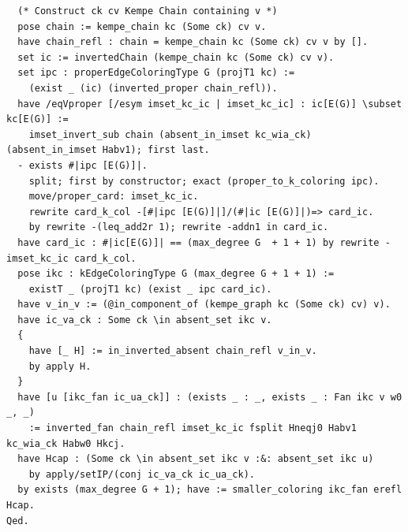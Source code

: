 \begin{verbatim}
  (* Construct ck cv Kempe Chain containing v *)
  pose chain := kempe_chain kc (Some ck) cv v.
  have chain_refl : chain = kempe_chain kc (Some ck) cv v by [].
  set ic := invertedChain (kempe_chain kc (Some ck) cv v).
  set ipc : properEdgeColoringType G (projT1 kc) :=  
    (exist _ (ic) (inverted_proper chain_refl)).
  have /eqVproper [/esym imset_kc_ic | imset_kc_ic] : ic[E(G)] \subset kc[E(G)] := 
    imset_invert_sub chain (absent_in_imset kc_wia_ck) (absent_in_imset Habv1); first last.
  - exists #|ipc [E(G)]|.
    split; first by constructor; exact (proper_to_k_coloring ipc).
    move/proper_card: imset_kc_ic. 
    rewrite card_k_col -[#|ipc [E(G)]|]/(#|ic [E(G)]|)=> card_ic.
    by rewrite -(leq_add2r 1); rewrite -addn1 in card_ic.
  have card_ic : #|ic[E(G)]| == (max_degree G  + 1 + 1) by rewrite -imset_kc_ic card_k_col.
  pose ikc : kEdgeColoringType G (max_degree G + 1 + 1) := 
    existT _ (projT1 kc) (exist _ ipc card_ic).
  have v_in_v := (@in_component_of (kempe_graph kc (Some ck) cv) v).
  have ic_va_ck : Some ck \in absent_set ikc v.
  {
    have [_ H] := in_inverted_absent chain_refl v_in_v.
    by apply H.
  }
  have [u [ikc_fan ic_ua_ck]] : (exists _ : _, exists _ : Fan ikc v w0 _, _)
    := inverted_fan chain_refl imset_kc_ic fsplit Hneqj0 Habv1 kc_wia_ck Habw0 Hkcj.
  have Hcap : (Some ck \in absent_set ikc v :&: absent_set ikc u) 
    by apply/setIP/(conj ic_va_ck ic_ua_ck).
  by exists (max_degree G + 1); have := smaller_coloring ikc_fan erefl Hcap.
Qed.
\end{verbatim}